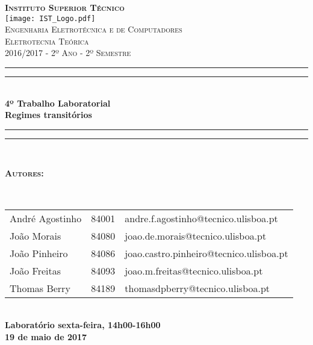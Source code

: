 \begin{titlepage}

\center

\textsc{\bfseries\LARGE Instituto Superior Técnico}\\[1cm] %
\texttt{[image: IST\_Logo.pdf]}\\[5cm]

\textsc{\large Engenharia Eletrotécnica e de Computadores}\\[0.5cm] %
\textsc{\Large Eletrotecnia Teórica}\\[0.5cm] %
\textsc{\large 2016/2017 - 2º Ano - 2º Semestre}\\

\rule{\textwidth}{1.6pt}\vspace*{-\baselineskip}\vspace*{2pt} %
\rule{\textwidth}{0.4pt}\\[\baselineskip] %

{\Huge \bfseries 4º Trabalho Laboratorial}\\[0.2cm]
\bigskip
{\huge \bfseries Regimes transitórios}\\[0.2cm]

\rule{\textwidth}{0.4pt}\vspace*{-\baselineskip}\vspace{3.2pt} %
\rule{\textwidth}{1.6pt}\\[5cm]

\begin{minipage}{0.9\textwidth}
	\begin{flushleft} \large
		\begin{Large}\bfseries\textsc{Autores:}\end{Large}\\[0.4cm]
		\begin{tabular}{l l l}
			André Agostinho & 84001 & \normalsize andre.f.agostinho@tecnico.ulisboa.pt \\
			João Morais			& 84080 & \normalsize	joao.de.morais@tecnico.ulisboa.pt \\
			João Pinheiro		& 84086 & \normalsize joao.castro.pinheiro@tecnico.ulisboa.pt \\
			João Freitas		& 84093 & \normalsize joao.m.freitas@tecnico.ulisboa.pt \\
			Thomas Berry		& 84189 & \normalsize thomasdpberry@tecnico.ulisboa.pt \\
		\end{tabular}
	\end{flushleft}
\end{minipage}\\[0.5cm]

\large \bfseries Laboratório sexta-feira, 14h00-16h00\\
\large 19 de maio de 2017\\[1cm]

\end{titlepage}
